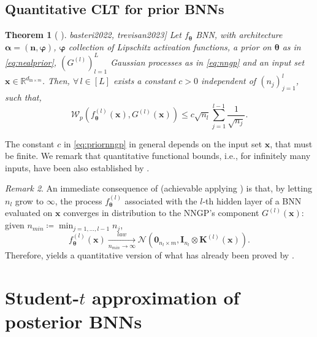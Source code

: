 \documentclass[a4paper, 11pt, reqno]{amsart}
\newcommand{\citet}[2][]{\citeauthor{#2} \cite[#1]{#2}}
\theoremstyle{plain}
\newtheorem{theorem}{Theorem}[section]
\theoremstyle{remark}
\newtheorem{remark}[theorem]{Remark}
\theoremstyle{definition}
\newcommand{\normal}[2]{\mathcal{N}\left(#1, #2\right)}
\newcommand{\wass}[3][2]{\mathcal{W}_{#1}\left(#2, #3\right)}
\newcommand{\real}{\mathbb{R}}
\let\oldforall\forall
\renewcommand{\forall}{\oldforall\,}
\begin{document}
\subsection{Quantitative CLT for prior BNNs} 

\begin{theorem}[\citet{basteri2022, trevisan2023}] \label{thm:priornngp}
    Let $f_{\bm{\theta}}$ BNN, with architecture $\bm{\alpha} = (\bm{n}, \bm{\varphi})$, $\bm{\varphi}$ collection of Lipschitz activation functions, a prior on $\bm{\theta}$ as in \cref{eq:nealprior}, $\left(G^{(l)}\right)_{l = 1}^L$ Gaussian processes as in \cref{eq:nngp} and an input set $\bm{x} \in \real^{d_{\mathrm{in} \times m}}$. Then, $\forall l \in [L]$ exists a constant $c > 0$ independent of $\left(n_j\right)_{j = 1}^l$, such that,
    \begin{equation} \label{eq:priornngp}
        \wass[p]{f_{\bm{\theta}}^{(l)}(\bm{x})}{G^{(l)}(\bm{x})} \leq c \sqrt{n_l} \sum_{j = 1}^{l - 1} \frac{1}{\sqrt{n_j}}.
    \end{equation}
\end{theorem}

The constant $c$ in \cref{eq:priornngp} in general depends on the input set $\bm{x}$, that must be finite. We remark that quantitative functional bounds, i.e., for infinitely many inputs, have been also established by \citet{favaro2024}.

\begin{remark} \label{rem:gaussposterior}
    An immediate consequence of  (achievable applying ) is that, by letting $n_l$ grow to $\infty$, the process $f^{(l)}_{\bm{\theta}}$ associated with the $l$-th hidden layer of a BNN evaluated on $\bm{x}$ converges in distribution to the NNGP's component $G^{(l)}(\bm{x})$: given $n_{min} \coloneqq \min_{j = 1, \dots, l - 1} n_j$,
    \begin{equation*}
        f^{(l)}_{\bm{\theta}}(\bm{x}) \xrightarrow[n_{min} \to \infty]{law} \normal{\bm{0}_{n_l \times m}}{\bm{I}_{n_l} \otimes \bm{K}^{(l)}(\bm{x})}.
    \end{equation*} 
    Therefore,  yields a quantitative version of what has already been proved by \citet{matthews2018,lee2018}.	
\end{remark}

\section{\texorpdfstring{Student-$t$}{Student-t} approximation of posterior BNNs} \label{sec:mainresult}
\end{document}

